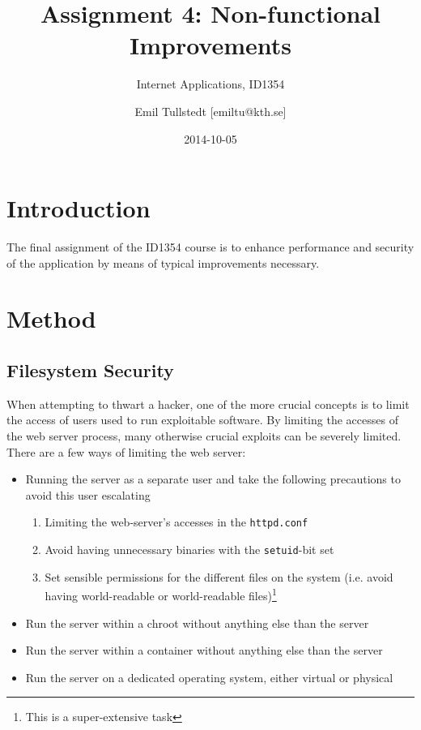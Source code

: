 \documentclass[a4paper]{scrartcl}
\title{Assignment 4: Non-functional Improvements}
\subtitle{Internet Applications, ID1354}
\author{Emil Tullstedt [emiltu@kth.se]}
\date{2014-10-05}
\begin{document}
\maketitle

\newpage

\tableofcontents

\newpage

\section{Introduction}

The final assignment of the ID1354 course is to enhance performance and security of the application by means of typical improvements necessary.

\section{Method}

\subsection{Filesystem Security}

When attempting to thwart a hacker, one of the more crucial concepts is to limit the access of users used to run exploitable software. By limiting the accesses of the web server process, many otherwise crucial exploits can be severely limited. There are a few ways of limiting the web server:

\begin{itemize}
\item Running the server as a separate user and take the following precautions to avoid this user escalating
\begin{enumerate}
\item Limiting the web-server's accesses in the \texttt{httpd.conf}
\item Avoid having unnecessary binaries with the \texttt{setuid}-bit set
\item Set sensible permissions for the different files on the system (i.e. avoid having world-readable or world-readable files)\footnote{This is a super-extensive task}
\end{enumerate}
\item Run the server within a chroot without anything else than the server
\item Run the server within a container without anything else than the server
\item Run the server on a dedicated operating system, either virtual or physical
\end{itemize}
\end{document}
